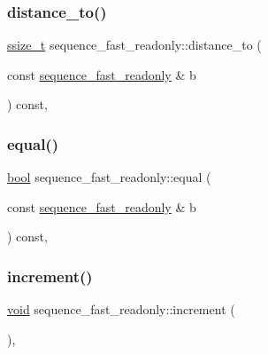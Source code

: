 \mbox{\label{classsequence__fast__readonly_a943d3956a923d5e3bbe3e1e944a20699}} 
\subsubsection{\texorpdfstring{distance\_to()}{distance\_to()}}
{\footnotesize\ttfamily \mbox{\hyperlink{detail_2common_8h_ac430d16fc097b3bf0a7469cfd09decda}{ssize\+\_\+t}} sequence\+\_\+fast\+\_\+readonly\+::distance\+\_\+to (\begin{DoxyParamCaption}\item[{const \mbox{\hyperlink{classsequence__fast__readonly}{sequence\+\_\+fast\+\_\+readonly}} \&}]{b }\end{DoxyParamCaption}) const\hspace{0.3cm}{\ttfamily [inline]}, {\ttfamily [protected]}}

\mbox{\label{classsequence__fast__readonly_afcbe394740b9209db9a28034e5483794}} 
\subsubsection{\texorpdfstring{equal()}{equal()}}
{\footnotesize\ttfamily \mbox{\hyperlink{asdl_8h_af6a258d8f3ee5206d682d799316314b1}{bool}} sequence\+\_\+fast\+\_\+readonly\+::equal (\begin{DoxyParamCaption}\item[{const \mbox{\hyperlink{classsequence__fast__readonly}{sequence\+\_\+fast\+\_\+readonly}} \&}]{b }\end{DoxyParamCaption}) const\hspace{0.3cm}{\ttfamily [inline]}, {\ttfamily [protected]}}

\mbox{\label{classsequence__fast__readonly_a36b3faf2c60a135e8245d7bf8d922000}} 
\subsubsection{\texorpdfstring{increment()}{increment()}}
{\footnotesize\ttfamily \mbox{\hyperlink{_s_d_l__opengles2__gl2ext_8h_ae5d8fa23ad07c48bb609509eae494c95}{void}} sequence\+\_\+fast\+\_\+readonly\+::increment (\begin{DoxyParamCaption}{ }\end{DoxyParamCaption})\hspace{0.3cm}{\ttfamily [inline]}, {\ttfamily [protected]}}



